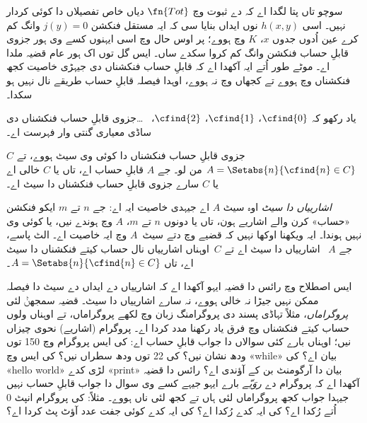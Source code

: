 \documentclass[../../../include/open-logic-section]{subfiles}
\begin{document}

سوچو تاں پتا لگدا اے کہ
 دے
ثبوت وچ $\fn{Tot}$ دیاں
خاص تفصیلاں دا کوئی کردار
نہیں۔ اسی $h(x,y)$ نوں
ایداں بنایا سی کہ ایہ
مستقل فنکشن
$j(y) = 0$ وانگ کم کرے
عین اُدوں جدوں
$x$، $K$ وچ ہووے؛
پر اوس حال وچ اسی ایہنوں
کسے وی ہور جزوی قابلِ حساب
فنکشن وانگ کم کروا سکدے
ساں۔ ایس گل توں اک ہور
عام قضیہ ملدا اے۔ موٹے طور اُتے
ایہ آکھدا اے کہ قابلِ حساب فنکشناں
دی جیہڑی خاصیت کجھ فنکشناں وچ ہووے
تے کجھاں وچ نہ ہووے، اوہدا فیصلہ
قابلِ حساب طریقے نال نہیں ہو سکدا۔

یاد رکھو کہ $\cfind{0}$،
$\cfind{1}$، $\cfind{2}$،
~\dots جزوی قابلِ حساب
فنکشناں دی ساڈی معیاری
گنتی وار فہرست اے۔

\begin{thm}
  $C$ جزوی قابلِ حساب فنکشناں
  دا کوئی وی سیٹ ہووے،
  تے $A =
  \Setabs{n}{\cfind{n} \in C}$
  من لو۔ جے $A$ قابلِ حساب
  اے، تاں یا $C$ خالی اے
  یا $C$ سارے جزوی قابلِ حساب
  فنکشناں دا سیٹ اے۔
\end{thm}

{\em اشارییاں دا سیٹ} اوہ
سیٹ $A$ اے جیہدی خاصیت
ایہ اے: جے $n$ تے $m$
ایکو فنکشن «حساب» کرن
والے اشاریے ہون، تاں
یا دونوں $n$ تے $m$،
$A$ وچ ہوندے نیں، یا
کوئی وی نہیں ہوندا۔
ایہ ویکھنا اوکھا نہیں کہ قضیے وچ
دتے سیٹ~$A$ وچ ایہ خاصیت اے۔
الٹ پاسے، جے $A$~
اشارییاں دا سیٹ اے تے
$C$~اوہناں اشارییاں
نال حساب کیتے فنکشناں
دا سیٹ اے، تاں
$A = \Setabs{n}{\cfind{n} \in C}$۔

\begin{explain}
ایس اصطلاح وچ رائس دا
قضیہ ایہو آکھدا اے کہ
اشارییاں دے ایداں دے
سیٹ دا فیصلہ ممکن نہیں
جیڑا نہ خالی ہووے، نہ
سارے اشارییاں دا سیٹ۔
قضیہ سمجھݨ لئی
\emph{پروگراماں}، مثلاً
تہاڈی پسند دی پروگرامنگ
زبان وچ لکھے پروگراماں،
تے اوہناں ولوں حساب کیتے
فنکشناں وچ فرق یاد رکھنا
مدد کردا اے۔ پروگرام
(اشاریے) نحوی چیزاں نیں؛
اوہناں بارے کئی سوالاں
دا جواب قابلِ حساب اے:
کی ایس پروگرام وچ 150
توں ودھ نشان نیں؟ کی
22 توں ودھ سطراں نیں؟
کی ایس وچ «while»
بیان اے؟ کی «hello world»
لڑی کدے «print» بیان
دا آرگومنٹ بن کے آؤندی اے؟
رائس دا قضیہ آکھدا اے
کہ پروگرام دے
\emph{روَیّے} بارے
ایہو جیہے کسے وی سوال دا جواب
قابلِ حساب نہیں جیہدا جواب کجھ
پروگراماں لئی ہاں تے کجھ لئی ناں ہووے۔
مثلاً: کی پروگرام انپٹ
$0$ اُتے رُکدا اے؟
کی ایہ کدے رُکدا اے؟
کی ایہ کدے کوئی جفت
عدد آؤٹ پٹ کردا اے؟
\end{explain}
\end{document}
